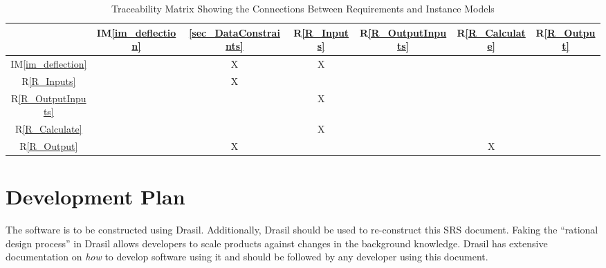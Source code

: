 \documentclass[12pt]{article}
\newcommand{\iref}[1]{IM\ref{#1}}
\newcommand{\rref}[1]{R\ref{#1}}
\begin{document}
\begin{table}[h!]
    \centering
    \begin{tabular}{|c|c|c|c|c|c|c|}
        \hline
                              & \iref{im_deflection} & \ref{sec_DataConstraints} & \rref{R_Inputs} & \rref{R_OutputInputs} & \rref{R_Calculate} & \rref{R_Output} \\ \hline
        \iref{im_deflection}  &                      & X                         & X               &                       &                    &                 \\ \hline
        \rref{R_Inputs}       &                      & X                         &                 &                       &                    &                 \\ \hline
        \rref{R_OutputInputs} &                      &                           & X               &                       &                    &                 \\ \hline
        \rref{R_Calculate}    &                      &                           & X               &                       &                    &                 \\ \hline
        \rref{R_Output}       &                      & X                         &                 &                       & X                  &                 \\ \hline
    \end{tabular}
    \caption{Traceability Matrix Showing the Connections Between Requirements and Instance Models}
    \label{Table:R_trace}
\end{table}


\section{Development Plan}
\label{sec_development_plan}

The software is to be constructed using Drasil. Additionally, Drasil should be
used to re-construct this SRS document. Faking the ``rational design process''
in Drasil allows developers to scale products against changes in the background
knowledge. Drasil has extensive documentation on \textit{how} to develop
software using it and should be followed by any developer using this document.
\end{document}
